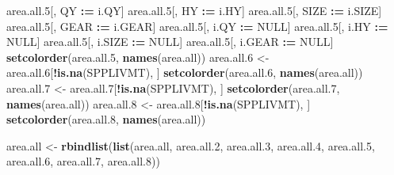 \documentclass[]{article}
\newenvironment{Shaded}{\begin{snugshade}}{\end{snugshade}}
\newcommand{\KeywordTok}[1]{\textcolor[rgb]{0.13,0.29,0.53}{\textbf{#1}}}
\newcommand{\DecValTok}[1]{\textcolor[rgb]{0.00,0.00,0.81}{#1}}
\newcommand{\StringTok}[1]{\textcolor[rgb]{0.31,0.60,0.02}{#1}}
\newcommand{\OtherTok}[1]{\textcolor[rgb]{0.56,0.35,0.01}{#1}}
\newcommand{\OperatorTok}[1]{\textcolor[rgb]{0.81,0.36,0.00}{\textbf{#1}}}
\newcommand{\ErrorTok}[1]{\textcolor[rgb]{0.64,0.00,0.00}{\textbf{#1}}}
\newcommand{\NormalTok}[1]{#1}
\begin{document}
\begin{Shaded}
\begin{Highlighting}[]
{{\NormalTok{  area.all.}\DecValTok{5}\NormalTok{[, QY     }\OperatorTok{:}\ErrorTok{=}\StringTok{ }\NormalTok{i.QY]}
\NormalTok{  area.all.}\DecValTok{5}\NormalTok{[, HY     }\OperatorTok{:}\ErrorTok{=}\StringTok{ }\NormalTok{i.HY]}
\NormalTok{  area.all.}\DecValTok{5}\NormalTok{[, SIZE   }\OperatorTok{:}\ErrorTok{=}\StringTok{ }\NormalTok{i.SIZE]}
\NormalTok{  area.all.}\DecValTok{5}\NormalTok{[, GEAR   }\OperatorTok{:}\ErrorTok{=}\StringTok{ }\NormalTok{i.GEAR]}
\NormalTok{  area.all.}\DecValTok{5}\NormalTok{[, i.QY   }\OperatorTok{:}\ErrorTok{=}\StringTok{ }\OtherTok{NULL}\NormalTok{]}
\NormalTok{  area.all.}\DecValTok{5}\NormalTok{[, i.HY   }\OperatorTok{:}\ErrorTok{=}\StringTok{ }\OtherTok{NULL}\NormalTok{]}
\NormalTok{  area.all.}\DecValTok{5}\NormalTok{[, i.SIZE }\OperatorTok{:}\ErrorTok{=}\StringTok{ }\OtherTok{NULL}\NormalTok{]}
\NormalTok{  area.all.}\DecValTok{5}\NormalTok{[, i.GEAR }\OperatorTok{:}\ErrorTok{=}\StringTok{ }\OtherTok{NULL}\NormalTok{]}
  \KeywordTok{setcolorder}\NormalTok{(area.all.}\DecValTok{5}\NormalTok{, }\KeywordTok{names}\NormalTok{(area.all))}
\NormalTok{  area.all.}\DecValTok{6}\NormalTok{ <-}\StringTok{ }\NormalTok{area.all.}\DecValTok{6}\NormalTok{[}\OperatorTok{!}\KeywordTok{is.na}\NormalTok{(SPPLIVMT), ]}
  \KeywordTok{setcolorder}\NormalTok{(area.all.}\DecValTok{6}\NormalTok{, }\KeywordTok{names}\NormalTok{(area.all))}
\NormalTok{  area.all.}\DecValTok{7}\NormalTok{ <-}\StringTok{ }\NormalTok{area.all.}\DecValTok{7}\NormalTok{[}\OperatorTok{!}\KeywordTok{is.na}\NormalTok{(SPPLIVMT), ]}
  \KeywordTok{setcolorder}\NormalTok{(area.all.}\DecValTok{7}\NormalTok{, }\KeywordTok{names}\NormalTok{(area.all))}
\NormalTok{  area.all.}\DecValTok{8}\NormalTok{ <-}\StringTok{ }\NormalTok{area.all.}\DecValTok{8}\NormalTok{[}\OperatorTok{!}\KeywordTok{is.na}\NormalTok{(SPPLIVMT), ]}
  \KeywordTok{setcolorder}\NormalTok{(area.all.}\DecValTok{8}\NormalTok{, }\KeywordTok{names}\NormalTok{(area.all))}
  
\NormalTok{  area.all <-}\StringTok{ }\KeywordTok{rbindlist}\NormalTok{(}\KeywordTok{list}\NormalTok{(area.all,   area.all.}\DecValTok{2}\NormalTok{, area.all.}\DecValTok{3}\NormalTok{, area.all.}\DecValTok{4}\NormalTok{, }
\NormalTok{                             area.all.}\DecValTok{5}\NormalTok{, area.all.}\DecValTok{6}\NormalTok{, area.all.}\DecValTok{7}\NormalTok{, area.all.}\DecValTok{8}\NormalTok{))}
  
}}
\end{Highlighting}
\end{Shaded}
\end{document}
